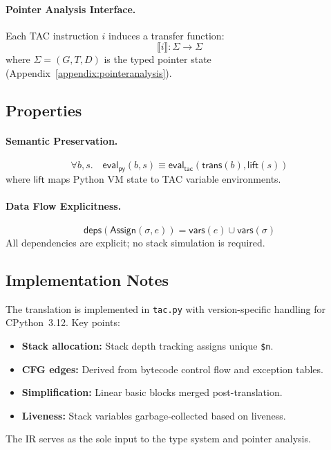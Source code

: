 \paragraph{Pointer Analysis Interface.}
Each TAC instruction $i$ induces a transfer function:
\[
\llbracket i \rrbracket : \Sigma \to \Sigma
\]
where $\Sigma = (G, T, D)$ is the typed pointer state (Appendix~\ref{appendix:pointeranalysis}).

\subsection{Properties}

\paragraph{Semantic Preservation.}
\[
\forall b, s. \quad
\mathsf{eval}_{\mathsf{py}}(b, s) \equiv
\mathsf{eval}_{\mathsf{tac}}(\mathsf{trans}(b), \mathsf{lift}(s))
\]
where $\mathsf{lift}$ maps Python VM state to TAC variable environments.

\paragraph{Data Flow Explicitness.}
\[
\mathsf{deps}(\mathsf{Assign}(\sigma, e)) =
\mathsf{vars}(e) \cup \mathsf{vars}(\sigma)
\]
All dependencies are explicit; no stack simulation is required.

\subsection{Implementation Notes}

The translation is implemented in \texttt{tac.py} with version-specific handling for CPython~3.12. Key points:
\begin{itemize}
\item \textbf{Stack allocation:} Stack depth tracking assigns unique \texttt{\$n}.
\item \textbf{CFG edges:} Derived from bytecode control flow and exception tables.
\item \textbf{Simplification:} Linear basic blocks merged post-translation.
\item \textbf{Liveness:} Stack variables garbage-collected based on liveness.
\end{itemize}
The IR serves as the sole input to the type system and pointer analysis.
